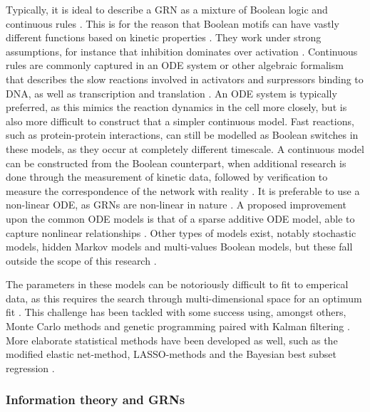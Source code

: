 \documentclass[../main.tex]{subfiles}
\begin{document}
Typically, it is ideal to describe a GRN as a mixture of Boolean logic and continuous rules \cite{bolouri2002modeling}.
This is for the reason that Boolean motifs can have vastly different functions based on kinetic properties \cite{ingram2006network}.
They work under strong assumptions, for instance that inhibition dominates over activation \cite{}.
Continuous rules are commonly captured in an ODE system or other algebraic formalism that describes the slow reactions involved in activators and surpressors binding to DNA, as well as transcription and translation \cite{ingram2006network}.
An ODE system is typically preferred, as this mimics the reaction dynamics in the cell more closely, but is also more difficult to construct that a simpler continuous model.
Fast reactions, such as protein-protein interactions, can still be modelled as Boolean switches in these models, as they occur at completely different timescale.
A continuous model can be constructed  from the Boolean counterpart, when additional research is done through the measurement of kinetic data, followed by verification to measure the correspondence of the network with reality \cite{bolouri2002modeling}.
It is preferable to use a non-linear ODE, as GRNs are non-linear in nature \cite{qian2008inference, tyson2003sniffers}.
A proposed improvement upon the common ODE models is that of a sparse additive ODE model, able to capture nonlinear relationships \cite{wu2014sparse}.
Other types of models exist, notably stochastic models, hidden Markov models and multi-values Boolean models, but these fall outside the scope of this research \cite{bolouri2002modeling, wu2014sparse}.

The parameters in these models can be notoriously difficult to fit to emperical data, as this requires the search through multi-dimensional space for an optimum fit \cite{bolouri2002modeling, kuhn2009monte}.
This challenge has been tackled with some success using, amongst others, Monte Carlo methods and genetic programming paired with Kalman filtering \cite{qian2008inference, kuhn2009monte}.
More elaborate statistical methods have been developed as well, such as the modified elastic net-method, LASSO-methods and the Bayesian best subset regression \cite{greenfield2013robust, wu2014sparse}.

\subsubsection{Information theory and GRNs}
\end{document}
